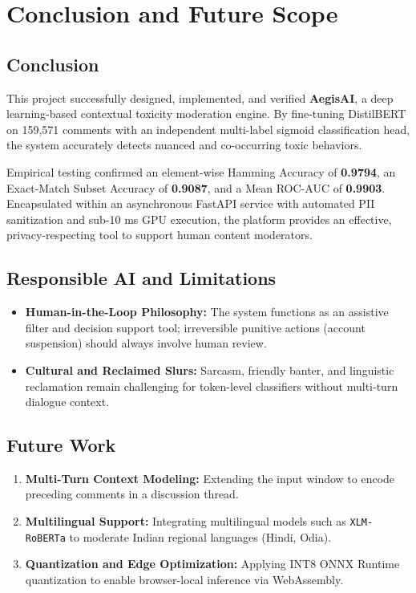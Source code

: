\documentclass[12pt,a4paper]{article}
\begin{document}
\section{Conclusion and Future Scope}

\subsection{Conclusion}
This project successfully designed, implemented, and verified \textbf{AegisAI}, a deep learning-based contextual toxicity moderation engine. By fine-tuning DistilBERT on 159,571 comments with an independent multi-label sigmoid classification head, the system accurately detects nuanced and co-occurring toxic behaviors. 

Empirical testing confirmed an element-wise Hamming Accuracy of \textbf{0.9794}, an Exact-Match Subset Accuracy of \textbf{0.9087}, and a Mean ROC-AUC of \textbf{0.9903}. Encapsulated within an asynchronous FastAPI service with automated PII sanitization and sub-10 ms GPU execution, the platform provides an effective, privacy-respecting tool to support human content moderators.

\subsection{Responsible AI and Limitations}
\begin{itemize}
    \item \textbf{Human-in-the-Loop Philosophy:} The system functions as an assistive filter and decision support tool; irreversible punitive actions (account suspension) should always involve human review.
    \item \textbf{Cultural and Reclaimed Slurs:} Sarcasm, friendly banter, and linguistic reclamation remain challenging for token-level classifiers without multi-turn dialogue context.
\end{itemize}

\subsection{Future Work}
\begin{enumerate}
    \item \textbf{Multi-Turn Context Modeling:} Extending the input window to encode preceding comments in a discussion thread.
    \item \textbf{Multilingual Support:} Integrating multilingual models such as \texttt{XLM-RoBERTa} to moderate Indian regional languages (Hindi, Odia).
    \item \textbf{Quantization and Edge Optimization:} Applying INT8 ONNX Runtime quantization to enable browser-local inference via WebAssembly.
\end{enumerate}
\end{document}
